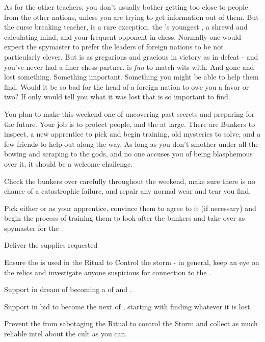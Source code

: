 \documentclass[char]{GL2020}
\begin{document}
As for the other teachers, you don’t usually bother getting too close to people from the other nations, unless you are trying to get information out of them. But the curse breaking teacher, \cPrince{} is a rare exception. \cPrince{\They} \cPrince{\are} the \cQueen{\Majesty}’s youngest , a shrewd and calculating mind, and your frequent opponent in chess. Normally one would expect the spymaster to prefer the leaders of foreign nations to be not particularly clever. But \cPrince{} is as gregarious and gracious in victory as in defeat - and you’ve never had a finer chess partner. \cPrince{} is \emph{fun} to match wits with. And \cPrince{\they} \cPrince{\have} gone and lost something. Something important. Something you might be able to help them find. Would it be so bad for the head of a foreign nation to owe you a favor or two? If only \cPrince{\they} would tell you what it was \cPrince{\they} lost that is so important to find.

You plan to make this weekend one of uncovering past secrets and preparing for the future. Your job is to protect people, and the \pShip{} at large. There are Bunkers to inspect, a new apprentice to pick and begin training, old mysteries to solve, and a few friends to help out along the way. As long as you don’t smother under all the bowing and scraping to the gods, and no one accuses you of being blasphemous over it, it should be a welcome challenge.

\begin{itemz}[Goals]
	\item Check the bunkers over carefully throughout the weekend, make sure there is no chance of a catastrophic failure, and repair any normal wear and tear you find.
	\item Pick either \cTechStar{} or \cInitiate{} as your apprentice, convince them to agree to it (if necessary) and begin the process of training them to look after the bunkers and take over as spymaster for the \pShippies{}.
	\item Deliver the supplies \cTechStar{} requested
	\item Ensure the \iNet{} is used in the Ritual to Control the storm - in general, keep an eye on the relics and investigate anyone suspicious for connection to the \pGoaties{}.
	\item Support \cPirate{} in \cPirate{\their} dream of becoming a \cPirate{\cleric} of \cEbb{} and \cFlow{}.
	\item Support \cPrince{} in \cPrince{\their} bid to become the next \cPrince{\Majesty} of \pFarm{}, starting with finding whatever it is \cPrince{\they} lost.
	\item Prevent the \pGoaties{} from sabotaging the Ritual to control the Storm and collect as much reliable intel about the cult as you can.
\end{itemz}
\end{document}
